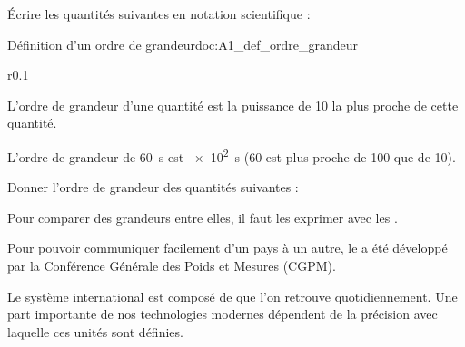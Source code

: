 \numeroQuestion Écrire les quantités suivantes en notation scientifique :
  



\begin{doc}{Définition d'un ordre de grandeur}{doc:A1_def_ordre_grandeur}
  \begin{wrapfigure}[3]{r}{0.1\linewidth}
    \vspace*{-32pt}
  \end{wrapfigure}

  \vAligne{-36pt}
  \begin{encart}
    L'ordre de grandeur d'une quantité est la puissance de 10 la plus proche de cette quantité.
  \end{encart}
  \exemple L'ordre de grandeur de \qty{60}{\s} est \qty{e2}{\s} (60 est plus proche de 100 que de 10). 
\end{doc}


\newpage
\vspace*{-28pt}
\numeroQuestion Donner l'ordre de grandeur des quantités suivantes :




\vspace*{-12pt}

Pour comparer des grandeurs entre elles, il faut les exprimer avec les . %

Pour pouvoir communiquer facilement d'un pays à un autre, le  a été développé par la Conférence Générale des Poids et Mesures (CGPM). %

Le système international est composé de  que l'on retrouve quotidiennement. Une part importante de nos technologies modernes dépendent de la précision avec laquelle ces unités sont définies.

